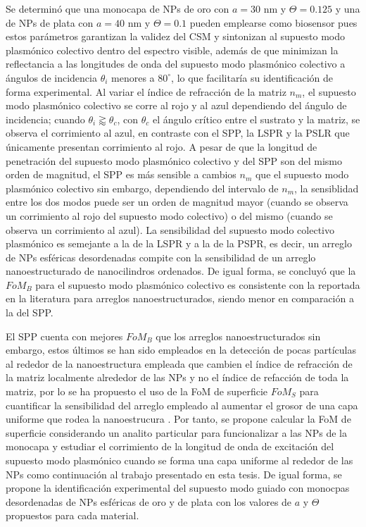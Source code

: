 Se determinó que una monocapa de NPs de oro con $a=30$ nm y $\Theta=0.125$ y una de NPs de plata con $a=40$ nm y $\Theta=0.1$ pueden emplearse como biosensor pues estos parámetros garantizan la validez del CSM y sintonizan al supuesto modo plasmónico colectivo dentro del espectro visible, además de que minimizan la reflectancia a las longitudes de onda del supuesto modo plasmónico colectivo a ángulos de incidencia $\theta_i$ menores a $80^\circ$, lo que facilitaría su identificación de forma experimental. Al variar el índice de refracción de la matriz $n_m$, el supuesto modo plasmónico colectivo se corre al rojo y al azul dependiendo del ángulo de incidencia; cuando $\theta_i\gtrapprox\theta_c$, con $\theta_c$ el ángulo crítico entre el sustrato y la matriz, se observa el corrimiento al azul, en contraste con el SPP, la LSPR y la PSLR que únicamente presentan corrimiento al rojo. A pesar de que la longitud de penetración del supuesto modo plasmónico colectivo y del SPP son del mismo orden de magnitud, el SPP es más sensible a cambios $n_m$ que el supuesto modo plasmónico colectivo sin embargo, dependiendo del intervalo de $n_m$, la sensiblidad entre los dos modos puede ser un orden de magnitud mayor (cuando se observa un corrimiento al rojo del supuesto modo colectivo) o del mismo (cuando se observa un corrimiento al azul). La sensibilidad del supuesto modo colectivo plasmónico es semejante a la de la LSPR y a la de la PSPR, es decir, un arreglo de NPs esféricas desordenadas compite con la sensibilidad de un arreglo nanoestructurado de nanocilindros ordenados. De igual forma, se concluyó que la $\textit{FoM}_B$ para el supuesto modo plasmónico colectivo es consistente con la reportada en la literatura para arreglos nanoestructurados, siendo menor en comparación a la del SPP.

El SPP cuenta con mejores $\textit{FoM}_B$ que los arreglos nanoestructurados sin embargo, estos últimos se han sido empleados en la detección de pocas partículas al rededor de la nanoestructura empleada que cambien el índice de refracción de la matriz localmente alrededor de las NPs y no el índice de refacción de toda la matriz, por lo se ha propuesto el uso de la FoM de superficie $\textit{FoM}_S$ para cuantificar la sensibilidad del arreglo empleado al aumentar el grosor de una capa uniforme que rodea la nanoestrucura \cite{estevez2014trends,svedendahl2009refractometric}. Por tanto, se propone calcular la FoM de superficie considerando un analito particular para funcionalizar a las NPs de la monocapa y estudiar el corrimiento de la longitud de onda de excitación del supuesto modo plasmónico cuando se forma una capa uniforme al rededor de las NPs como continuación al trabajo presentado en esta tesis. De igual forma, se propone la identificación experimental del supuesto modo guiado con monocpas desordenadas de NPs esféricas de oro y de plata con los valores de $a$ y $\Theta$ propuestos para cada material. 